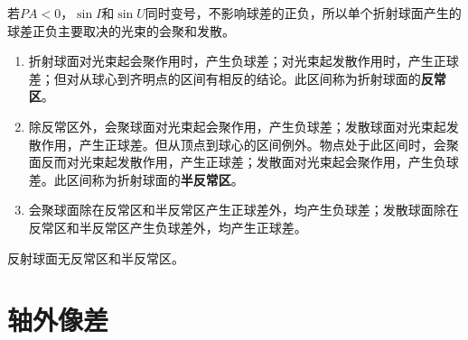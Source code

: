 \documentclass[cn,10pt,chinesefont=founder,math=mtpro2,cite=super,toc=onecol,twoside,openany]{elegantbook}
\begin{document}
\begin{table}[htbp]
	\centering
	\caption{$r<0$的球面在各区间内的球差正负}
	\label{tab:spherical-aberration-of-sphere-in-each-interval-2}
\end{table}

若$PA<0$，$\sin I$和$\sin U$同时变号，不影响球差的正负，所以单个折射球面产生的球差正负主要取决的光束的会聚和发散。

\begin{conclusion}
\begin{enumerate}
	\item 折射球面对光束起会聚作用时，产生负球差；对光束起发散作用时，产生正球差；但对从球心到齐明点的区间有相反的结论。此区间称为折射球面的\textbf{反常区}。
	\item 除反常区外，会聚球面对光束起会聚作用，产生负球差；发散球面对光束起发散作用，产生正球差。但从顶点到球心的区间例外。物点处于此区间时，会聚面反而对光束起发散作用，产生正球差；发散面对光束起会聚作用，产生负球差。此区间称为折射球面的\textbf{半反常区}。
	\item 会聚球面除在反常区和半反常区产生正球差外，均产生负球差；发散球面除在反常区和半反常区产生负球差外，均产生正球差。
\end{enumerate}
\end{conclusion}
\begin{note}
反射球面无反常区和半反常区。
\end{note}

\section{轴外像差}
\end{document}
